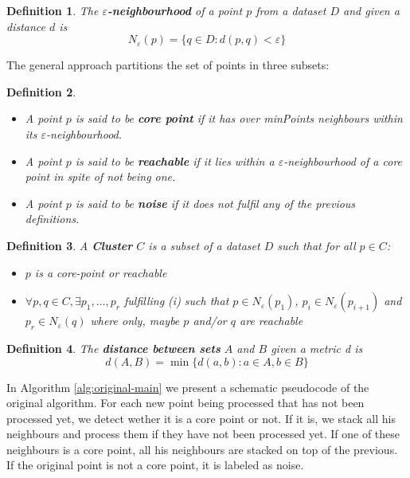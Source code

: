 \documentclass[10pt,journal,compsoc]{IEEEtran}
\newtheorem{definition}{Definition}
\begin{document}
\begin{definition}
The $\varepsilon$\textbf{-neighbourhood} of a point $p$ from a dataset $D$ and given a distance $d$ is
$$N_{\varepsilon}(p) = \lbrace q \in D: d(p,q) < \varepsilon \rbrace$$ 
\end{definition}

The general approach partitions the set of points in three subsets:
\begin{definition}
\begin{itemize}
\item A point $p$ is said to be \textbf{\textit{core point}} if it has over \textit{minPoints} neighbours within its $\varepsilon$-neighbourhood.
\item A point $p$ is said to be \textbf{\textit{reachable}} if it lies within a $\varepsilon$-neighbourhood of a core point in spite of not being one.
\item A point $p$ is said to be \textbf{\textit{noise}} if it does not fulfil any of the previous definitions.
\end{itemize}
\end{definition}

\begin{definition}
A \textbf{Cluster} $C$ is a subset of a dataset $D$ such that for all $p \in C$:
\begin{itemize}
\item[(i)] $p$ is a core-point or reachable
\item[(ii)] $\forall p,q \in C, \exists p_1, \ldots,  p_r$ fulfilling (i) such that $p \in N_{\varepsilon}(p_1)$, $p_i \in N_{\varepsilon}(p_{i+1})$ and $p_r \in N_{\varepsilon}(q)$ where only, maybe $p$ and/or $q$ are reachable
\end{itemize}
\end{definition}

\begin{definition} \label{dist-definition}
The \textbf{distance between sets} $A$ and $B$ given a metric d is
$$d(A,B)=\min \lbrace d(a,b): a \in A, b \in B \rbrace$$
\end{definition}

In Algorithm \ref{alg:original-main} we present a schematic pseudocode of the original algorithm. For each new point being processed that has not been processed yet, we detect wether it is a core point or not. If it is, we stack all his neighbours and process them if they have not been processed yet. If one of these neighbours is a core point, all his neighbours are stacked on top of the previous. If the original point is not a core point, it is labeled as noise.
\end{document}
